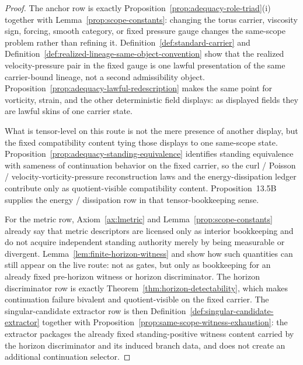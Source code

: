 \begin{proof}
The anchor row is exactly Proposition~\ref{prop:adequacy-role-triad}(i) together with Lemma~\ref{prop:scope-constants}: changing the torus carrier, viscosity sign, forcing, smooth category, or fixed pressure gauge changes the same-scope problem rather than refining it. Definition~\ref{def:standard-carrier} and Definition~\ref{def:realized-lineage-same-object-convention} show that the realized velocity-pressure pair in the fixed gauge is one lawful presentation of the same carrier-bound lineage, not a second admissibility object. Proposition~\ref{prop:adequacy-lawful-redescription} makes the same point for vorticity, strain, and the other deterministic field displays: as displayed fields they are lawful skins of one carrier state.

What is tensor-level on this route is not the mere presence of another display, but the fixed compatibility content tying those displays to one same-scope state. Proposition~\ref{prop:adequacy-standing-equivalence} identifies standing equivalence with sameness of continuation behavior on the fixed carrier, so the curl / Poisson / velocity-vorticity-pressure reconstruction laws and the energy-dissipation ledger contribute only as quotient-visible compatibility content. Proposition~13.5B supplies the energy / dissipation row in that tensor-bookkeeping sense.

For the metric row, Axiom~\ref{ax:lmetric} and Lemma~\ref{prop:scope-constants} already say that metric descriptors are licensed only as interior bookkeeping and do not acquire independent standing authority merely by being measurable or divergent. Lemma~\ref{lem:finite-horizon-witness} and \HorizonDetectabilityRef{} show how such quantities can still appear on the live route: not as gates, but only as bookkeeping for an already fixed pre-horizon witness or horizon discriminator. The horizon discriminator row is exactly Theorem~\ref{thm:horizon-detectability}, which makes continuation failure bivalent and quotient-visible on the fixed carrier. The singular-candidate extractor row is then Definition~\ref{def:singular-candidate-extractor} together with Proposition~\ref{prop:same-scope-witness-exhaustion}: the extractor packages the already fixed standing-positive witness content carried by the horizon discriminator and its induced branch data, and does not create an additional continuation selector.
\end{proof}

